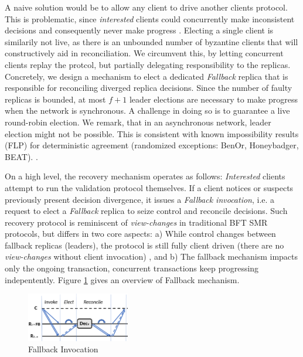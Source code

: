 A naive solution would be to allow any client to drive another clients protocol. This is problematic, since \textit{interested} clients could concurrently make inconsistent decisions and consequently never make progress . Electing a single client is similarily not live, as there is an unbounded number of byzantine clients that will constructively aid in reconciliation. We circumvent this, by letting concurrent clients replay the protcol, but partially delegating responsibility to the replicas. Concretely, we design a mechanism to elect  a dedicated \textit{Fallback} replica that is responsible for reconciling diverged replica decisions. Since the number of faulty replicas is bounded, at most $f+1$ leader elections are necessary to make progress when the network is synchronous. A challenge in doing so is to guarantee a live round-robin election. We remark, that in an asynchronous network, leader election might not be possible. This is consistent with known impossibility results (FLP) \cite{fischer1985impossibility} for deterministic agreement (randomized exceptions: BenOr, Honeybadger, BEAT). . 

On a high level, the recovery mechanism operates as follows: \textit{Interested} clients attempt to run the validation protocol themselves. If a client notices or suspects previously present decision divergence, it issues a \textit{Fallback invocation}, i.e. a request to elect a \textit{Fallback} replica to seize control and reconcile decisions. Such recovery protocol is reminiscent of \textit{view-changes} in traditional BFT SMR protocols, but differs in two core aspects: a) While control changes between fallback replicas (leaders), the protocol is still fully client driven (there are no \textit{view-changes} without client invocation) , and b) The fallback mechanism impacts only the ongoing transaction, concurrent transactions keep progressing indepentently. Figure \ref{fig:FallB} gives an overview of Fallback mechanism.

\begin{figure}

\includegraphics[width= 0.4\textwidth]{./figures/Fallback.png}

\caption{Fallback Invocation}
\label{fig:FallB}
\end{figure}

